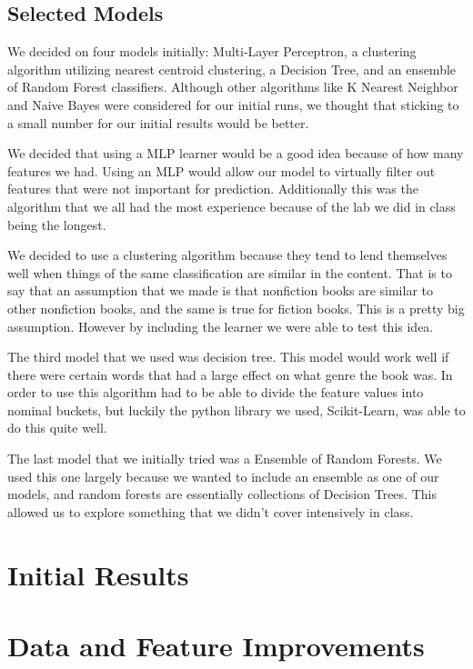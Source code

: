 \documentclass{article}
\begin{document}
\subsection{Selected Models}

We decided on four models initially: Multi-Layer Perceptron, a clustering algorithm utilizing nearest centroid clustering, a Decision Tree, and an ensemble of Random Forest classifiers. Although other algorithms like K Nearest Neighbor and Naive Bayes were considered for our initial runs, we thought that sticking to a small number for our initial results would be better. \par
	We decided that using a MLP learner would be a good idea because of how many features we had. Using an MLP would allow our model to virtually filter out features that were not important for prediction. Additionally this was the algorithm that we all had the most experience because of the lab we did in class being the longest. \par
	We decided to use a clustering algorithm because they tend to lend themselves well when things of the same classification are similar in the content. That is to say that an assumption that we made is that nonfiction books are similar to other nonfiction books, and the same is true for fiction books. This is a pretty big assumption. However by including the learner we were able to test this idea. \par
	The third model that we used was decision tree. This model would work well if there were certain words that had a large effect on what genre the book was. In order to use this algorithm had to be able to divide the feature values into nominal buckets, but luckily the python library we used, Scikit-Learn, was able to do this quite well. \par
	The last model that we initially tried was a Ensemble of Random Forests. We used this one largely because we wanted to include an ensemble as one of our models, and random forests are essentially collections of Decision Trees. This allowed us to explore something that we didn’t cover intensively in class.

\section{Initial Results}

\section{Data and Feature Improvements}
\end{document}
